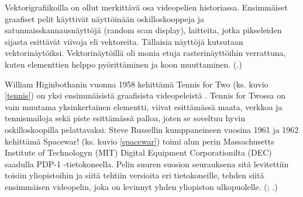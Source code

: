 \documentclass[utf8,bachelor]{gradu3}
\newcommand{\parencitedot}[1]{(\cite{#1}.)}
\newcommand{\parencitesdot}[2]{(\cite{#1}; \cite{#2}.)}
\begin{document}
Vektorigrafiikoilla on ollut merkittävä osa videopelien historiassa. Ensimmäiset graafiset pelit käyttivät näyttöinään oskilloskooppeja ja satunnaisskannausnäyttöjä (random scan display), laitteita, jotka pikseleiden sijasta esittävät viivoja eli vektoreita. Tällaisia näyttöjä kutsutaan vektorinäytöiksi. Vektorinäytöillä oli monia etuja rasterinäyttöihin verrattuna, kuten elementtien helppo pyörittäminen ja koon muuttaminen. \parencitedot{RefWorks:doc:5be179afe4b05afcfde72671}

William Higinbothanin vuonna 1958 kehittämä Tennis for Two (ks. kuvio \ref{tennis}) on yksi ensimmäisistä graafisista videopeleistä \parencite{RefWorks:doc:5be15b13e4b05b9281959f24}. Tennis for Twossa on vain muutama yksinkertainen elementti, viivat esittämässä maata, verkkoa ja tennismailoja sekä piste esittämässä palloa, joten se soveltuu hyvin oskilloskoopilla pelattavaksi. Steve Russellin kumppaneineen vuosina 1961 ja 1962 kehittämä Spacewar! (ks. kuvio \ref{spacewar}) toimi alun perin Massachusetts Institute of Technologyn (MIT) Digital Equipment Corporationilta (DEC) saadulla PDP-1 -tietokoneella. Pelin suuren suosion seurauksena sitä levitettiin toisiin yliopistoihin ja siitä tehtiin versioita eri tietokoneille, tehden siitä ensimmäisen videopelin, joka on levinnyt yhden yliopiston ulkopuolelle. \parencitesdot{RefWorks:doc:5be15b13e4b05b9281959f24}{RefWorks:doc:5be9d948e4b0304fd3d1692a}
\end{document}
